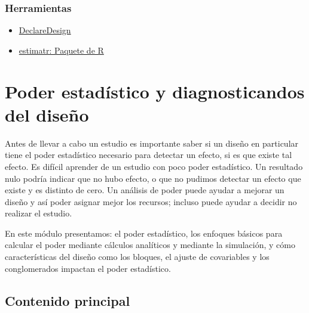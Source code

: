 \documentclass[
  12pt,
  spanish,
]{book}
\begin{document}
\hypertarget{herramientas-2}{%
\subsection{Herramientas}\label{herramientas-2}}

\begin{itemize}
\item
  \href{https://declaredesign.org}{DeclareDesign}
\item
  \href{https://declaredesign.org/r/estimatr/}{estimatr: Paquete de R}
\end{itemize}

\hypertarget{poder-estaduxedstico-y-diagnosticandos-del-diseuxf1o}{%
\chapter{Poder estadístico y diagnosticandos del diseño}\label{poder-estaduxedstico-y-diagnosticandos-del-diseuxf1o}}

Antes de llevar a cabo un estudio es importante saber si un diseño en particular tiene el poder estadístico necesario para detectar un efecto, si es que existe tal efecto. Es difícil aprender de un estudio con poco poder estadístico. Un resultado nulo podría indicar que no hubo efecto, o que no pudimos detectar un efecto que existe y es distinto de cero. Un análisis de poder puede ayudar a mejorar un diseño y así poder asignar mejor los recursos; incluso puede ayudar a decidir no realizar el estudio.

En este módulo presentamos: el poder estadístico, los enfoques básicos para calcular el poder mediante cálculos analíticos y mediante la simulación, y cómo características del diseño como los bloques, el ajuste de covariables y los conglomerados impactan el poder estadístico.

\hypertarget{contenido-principal-5}{%
\section{Contenido principal}\label{contenido-principal-5}}
\end{document}
